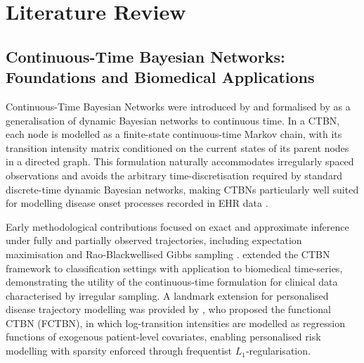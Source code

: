 \documentclass[12pt]{article}
\begin{document}
\section{Literature Review}
\label{sec:litrev}

\subsection{Continuous-Time Bayesian Networks: Foundations and
            Biomedical Applications}

Continuous-Time Bayesian Networks were introduced by
\citet{Nodelman2002,Nodelman2003} and formalised by \citet{nodelman2007continuous}
as a generalisation of dynamic Bayesian networks to continuous time.  In a
CTBN, each node is modelled as a finite-state continuous-time Markov chain,
with its transition intensity matrix conditioned on the current states of its
parent nodes in a directed graph.  This formulation naturally accommodates
irregularly spaced observations and avoids the arbitrary time-discretisation
required by standard discrete-time dynamic Bayesian networks, making CTBNs
particularly well suited for modelling disease onset processes recorded in
EHR data \citep{jackson2022comparison}.

Early methodological contributions focused on exact and approximate inference
under fully and partially observed trajectories, including expectation
maximisation and Rao-Blackwellised Gibbs sampling \citep{nodelman2007continuous,
CasellaRobert1996}.  \citet{stella2012continuous} extended the CTBN framework
to classification settings with application to biomedical time-series,
demonstrating the utility of the continuous-time formulation for clinical
data characterised by irregular sampling.  A landmark extension for personalised
disease trajectory modelling was provided by \citet{faruqui2021functional}, who
proposed the functional CTBN (FCTBN), in which log-transition intensities are
modelled as regression functions of exogenous patient-level covariates, enabling
personalised risk modelling with sparsity enforced through frequentist
$L_1$-regularisation.
\end{document}
